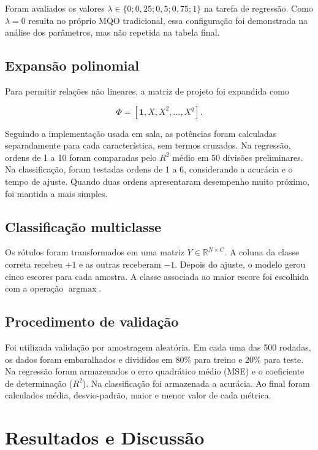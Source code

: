 \documentclass[conference]{IEEEtran}
\begin{document}
Foram avaliados os valores $\lambda\in\{0; 0,25; 0,5; 0,75; 1\}$ na tarefa de
regressão. Como $\lambda=0$ resulta no próprio MQO tradicional, essa configuração
foi demonstrada na análise dos parâmetros, mas não repetida na tabela final.

\subsection{Expansão polinomial}

Para permitir relações não lineares, a matriz de projeto foi expandida como

\begin{equation}
\Phi=[\mathbf{1},X,X^2,\ldots,X^q].
\label{eq:poly}
\end{equation}

Seguindo a implementação usada em sala, as potências foram calculadas
separadamente para cada característica, sem termos cruzados. Na regressão, ordens
de 1 a 10 foram comparadas pelo $R^2$ médio em 50 divisões preliminares. Na
classificação, foram testadas ordens de 1 a 6, considerando a acurácia e o tempo
de ajuste. Quando duas ordens apresentaram desempenho muito próximo, foi mantida
a mais simples.

\subsection{Classificação multiclasse}

Os rótulos foram transformados em uma matriz $Y\in\mathbb{R}^{N\times C}$. A
coluna da classe correta recebeu $+1$ e as outras receberam $-1$. Depois do
ajuste, o modelo gerou cinco escores para cada amostra. A classe associada ao maior
escore foi escolhida com a operação $\operatorname{argmax}$.

\subsection{Procedimento de validação}

Foi utilizada validação por amostragem aleatória. Em cada uma das 500 rodadas, os
dados foram embaralhados e divididos em 80\% para treino e 20\% para teste. Na
regressão foram armazenados o erro quadrático médio (MSE) e o coeficiente de
determinação ($R^2$). Na classificação foi armazenada a acurácia. Ao final foram
calculados média, desvio-padrão, maior e menor valor de cada métrica.

\section{Resultados e Discussão}
\end{document}
